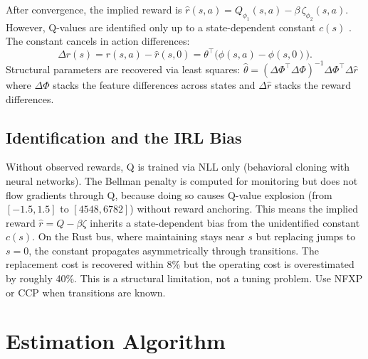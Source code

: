 \documentclass[10pt]{article}
\begin{document}
After convergence, the implied reward is $\hat r(s,a) = Q_{\phi_1}(s,a) - \beta\,\zeta_{\phi_2}(s,a)$. However, Q-values are identified only up to a state-dependent constant $c(s)$ \citep{ng1999, magnacThesmar2002}. The constant cancels in action differences:
\begin{equation}
\label{eq:projection}
\Delta r(s) = \hat r(s,a) - \hat r(s,0) = \theta^\top\bigl(\phi(s,a) - \phi(s,0)\bigr).
\end{equation}
Structural parameters are recovered via least squares:
$\hat\theta = (\Delta\Phi^\top\Delta\Phi)^{-1}\Delta\Phi^\top\Delta \hat r$
where $\Delta\Phi$ stacks the feature differences across states and $\Delta \hat r$ stacks the reward differences.

\subsection{Identification and the IRL Bias}

Without observed rewards, Q is trained via NLL only (behavioral cloning with neural networks). The Bellman penalty is computed for monitoring but does not flow gradients through Q, because doing so causes Q-value explosion (from $[-1.5, 1.5]$ to $[4548, 6782]$) without reward anchoring. This means the implied reward $\hat r = Q - \beta\zeta$ inherits a state-dependent bias from the unidentified constant $c(s)$. On the Rust bus, where maintaining stays near $s$ but replacing jumps to $s=0$, the constant propagates asymmetrically through transitions. The replacement cost is recovered within 8\% but the operating cost is overestimated by roughly 40\%. This is a structural limitation, not a tuning problem. Use NFXP or CCP when transitions are known.


\section{Estimation Algorithm}
\end{document}
